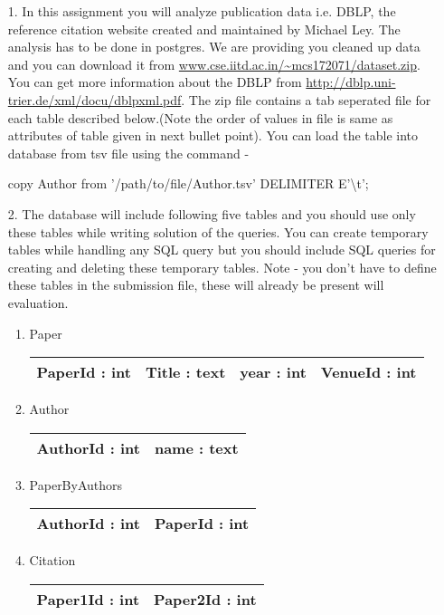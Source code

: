 \documentclass[10pt]{article}
\begin{document}
\begin{itemize}

\item[1.] In this assignment you will analyze publication data i.e. DBLP, the reference citation website created and maintained by Michael Ley. The analysis has to  be done in postgres. We are providing you cleaned up data and you can download it from  \url{www.cse.iitd.ac.in/~mcs172071/dataset.zip}. You can get more information about the DBLP from \url{http://dblp.uni-trier.de/xml/docu/dblpxml.pdf}. The zip file contains a tab seperated file for each table described below.(Note the order of values in file is same as attributes of table given in next bullet point). You can load the table into database from tsv file using the command - 

copy Author from '/path/to/file/Author.tsv' DELIMITER E'\textbackslash t';

\item[2.] The database will include following five tables and you should use only these tables while writing solution of the queries. You can create temporary tables while handling any SQL query but you should include SQL queries for creating and deleting these temporary tables. Note - you don't have to define these tables in the submission file, these will already be present will evaluation.


\begin{enumerate}
\item Paper\\
        \begin{tabular}{|c|c|c|c|}
            \hline
             PaperId : int & Title : text & year : int & VenueId : int\\
            \hline
        \end{tabular}
\item Author\\
        \begin{tabular}{|c|c|}
            \hline 
             AuthorId : int & name : text \\
            \hline
        \end{tabular}

\item PaperByAuthors\\
        \begin{tabular}{|c|c|}
            \hline 
             AuthorId : int & PaperId : int \\
            \hline
        \end{tabular}
\item Citation\\
        \begin{tabular}{|c|c|}
            \hline 
             Paper1Id : int & Paper2Id : int \\
            \hline
        \end{tabular}


\end{enumerate}
\end{itemize}
\end{document}
